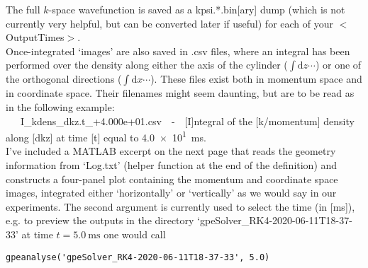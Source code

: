 \documentclass{jakedoc}
\begin{document}
The full $k$-space wavefunction is saved as a kpsi.*.bin[ary] dump (which is not currently very helpful, but can be converted later if useful) for each of your $<$OutputTimes$>$.\\

Once-integrated `images' are also saved in .csv files, where an integral has been performed over the density along either the axis of the cylinder ($\int\text{d}z\cdots$) or one of the orthogonal directions ($\int\text{d}x\cdots$).
These files exist both in momentum space and in coordinate space.
Their filenames might seem daunting, but are to be read as in the following example:\\

\ \ \ I\_kdens\_dkz.t\_+4.000e+01.csv\ \ -\ \ [I]ntegral of the [k/momentum] density along [dkz] at time [t] equal to \SI{4.0e1}{\milli\second}.\\

I've included a MATLAB excerpt on the next page that reads the geometry information from `Log.txt' (helper function at the end of the definition) and constructs a four-panel plot containing the momentum and coordinate space images, integrated either `horizontally' or `vertically' as we would say in our experiments. The second argument is currently used to select the time (in [\si{\milli\second}]), e.g. to preview the outputs in the directory `gpeSolver\_RK4-2020-06-11T18-37-33' at time $t=\SI{5.0}{\milli\second}$ one would call

\lstset{language=matlab}
\begin{lstlisting}
gpeanalyse('gpeSolver_RK4-2020-06-11T18-37-33', 5.0)
\end{lstlisting}

\clearpage
\end{document}
